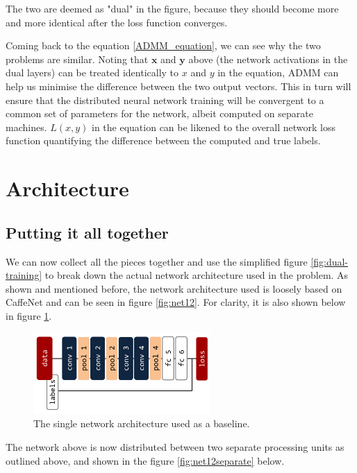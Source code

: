 \documentclass[a4paper, 12pt]{article}
\numberwithin{equation}{section}
\begin{document}
	The two are deemed as "dual" in the figure, because they should become more and more identical after the loss function converges.

	Coming back to the equation \ref{ADMM_equation}, we can see why the two problems are similar. Noting that $\boldsymbol x$ and $\boldsymbol y$ above (the network activations in the dual layers) can be treated identically to $x$ and $y$ in the equation, ADMM can help us minimise the difference between the two output vectors. This in turn will ensure that the distributed neural network training will be convergent to a common set of parameters for the network, albeit computed on separate machines. $L(x,y)$ in the equation can be likened to the overall network loss function quantifying the difference between the computed and true labels.

	\section{Architecture}

	\subsection{Putting it all together}

	We can now collect all the pieces together and use the simplified figure \ref{fig:dual-training} to break down the actual network architecture used in the problem. As shown and mentioned before, the network architecture used is loosely based on CaffeNet and can be seen in figure \ref{fig:net12}. For clarity, it is also shown below in figure \ref{fig:net12pretty}.

	\begin{figure}[!h]
		\centering
		\includegraphics[page=1,width=0.6\textwidth]{net12.pdf}
		\caption{\label{fig:net12pretty}{The single network architecture used as a baseline.}}
	\end{figure}

	The network above is now distributed between two separate processing units as outlined above, and shown in the figure \ref{fig:net12separate} below.
\end{document}
